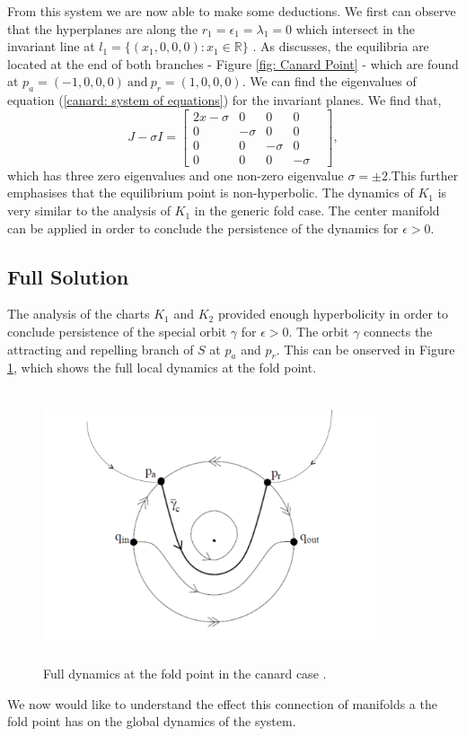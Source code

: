 From this system we are now able to make some deductions. We first can observe that the hyperplanes are along the $r_1=\epsilon_1=\lambda_1=0$ which intersect in the invariant line at $l_1=\{(x_1,0,0,0): x_1\in\mathbb{R}\}$ \citep{krupa2001}. As \citet{krupa2001} discusses, the equilibria are located at the end of both branches - Figure \ref{fig: Canard Point} - which are found at $p_a=(-1,0,0,0) \ \text{and} \ p_r=(1,0,0,0)$. We can find the eigenvalues of equation (\ref{canard: system of equations}) for the invariant planes. We find that, 
\begin{equation}
J-\sigma I= \begin{bmatrix}
2x-\sigma & 0 & 0 & 0  \\
0 & -\sigma & 0 & 0&\\
0 & 0 & -\sigma & 0 \\
0 & 0 & 0 & -\sigma
\end{bmatrix},
\end{equation}
which has three zero eigenvalues and one non-zero eigenvalue $\sigma=\pm 2$.This further emphasises that the equilibrium point is non-hyperbolic. 
The dynamics of $K_1$ is very similar to the analysis of $K_1$ in the generic fold case. The center manifold can be applied in order to conclude the persistence of the dynamics for $\epsilon >0$.

\subsection{Full Solution}
The analysis of the charts $K_1$ and $K_2$ provided enough hyperbolicity in order to conclude persistence of the special orbit $\gamma$ for $\epsilon >0$. The orbit $\gamma$ connects the attracting and repelling branch of $S$ at $p_a$ and $p_r$. This can be onserved in Figure \ref{canardsolloc}, which shows the full local dynamics at the fold point.
\begin{figure}[h!]\centering
	\includegraphics[height=8cm,width=10cm]{Images/pres-cancard}
	\caption{Full dynamics at the fold point in the canard case \citep{krupa2001}.}
	\label{canardsolloc}
\end{figure}
We now would like to understand the effect this connection of manifolds a the fold point has on the global dynamics of the system.

